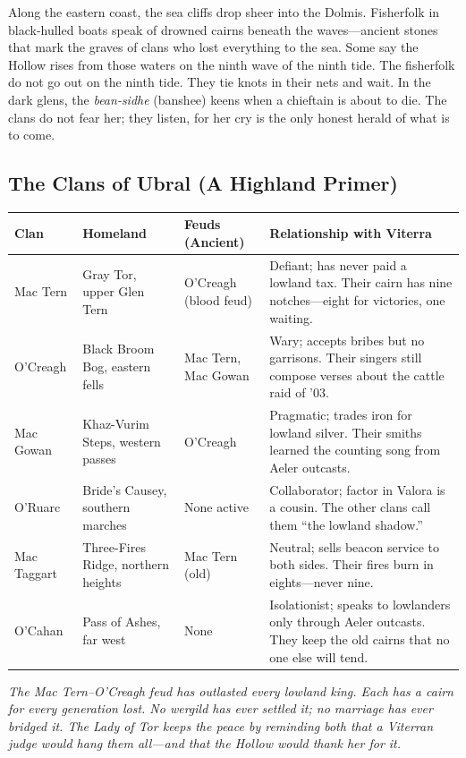 Along the eastern coast, the sea cliffs drop sheer into the Dolmis. Fisherfolk in black-hulled boats speak of drowned cairns beneath the waves---ancient stones that mark the graves of clans who lost everything to the sea. Some say the Hollow rises from those waters on the ninth wave of the ninth tide. The fisherfolk do not go out on the ninth tide. They tie knots in their nets and wait. In the dark glens, the \textit{bean-sidhe} (banshee) keens when a chieftain is about to die. The clans do not fear her; they listen, for her cry is the only honest herald of what is to come.

\subsection*{The Clans of Ubral (A Highland Primer)}
\label{subsec:ubral-clans}
\begin{tcolorbox}[colback=black!3,colframe=blue!60!black,title={The Great Houses of the Stone},breakable]
\small
\begin{tabular}{|p{}|p{}|p{}|p{}|}
\hline
\textbf{Clan} & \textbf{Homeland} & \textbf{Feuds (Ancient)} & \textbf{Relationship with Viterra} \\
\hline
Mac Tern & Gray Tor, upper Glen Tern & O'Creagh (blood feud) & Defiant; has never paid a lowland tax. Their cairn has nine notches---eight for victories, one waiting. \\
\hline
O'Creagh & Black Broom Bog, eastern fells & Mac Tern, Mac Gowan & Wary; accepts bribes but no garrisons. Their singers still compose verses about the cattle raid of '03. \\
\hline
Mac Gowan & Khaz-Vurim Steps, western passes & O'Creagh & Pragmatic; trades iron for lowland silver. Their smiths learned the counting song from Aeler outcasts. \\
\hline
O'Ruarc & Bride's Causey, southern marches & None active & Collaborator; factor in Valora is a cousin. The other clans call them ``the lowland shadow.'' \\
\hline
Mac Taggart & Three-Fires Ridge, northern heights & Mac Tern (old) & Neutral; sells beacon service to both sides. Their fires burn in eights---never nine. \\
\hline
O'Cahan & Pass of Ashes, far west & None & Isolationist; speaks to lowlanders only through Aeler outcasts. They keep the old cairns that no one else will tend. \\
\hline
\end{tabular}
\smallskip

\textit{The Mac Tern--O'Creagh feud has outlasted every lowland king. Each has a cairn for every generation lost. No wergild has ever settled it; no marriage has ever bridged it. The Lady of Tor keeps the peace by reminding both that a Viterran judge would hang them all---and that the Hollow would thank her for it.}
\end{tcolorbox}

